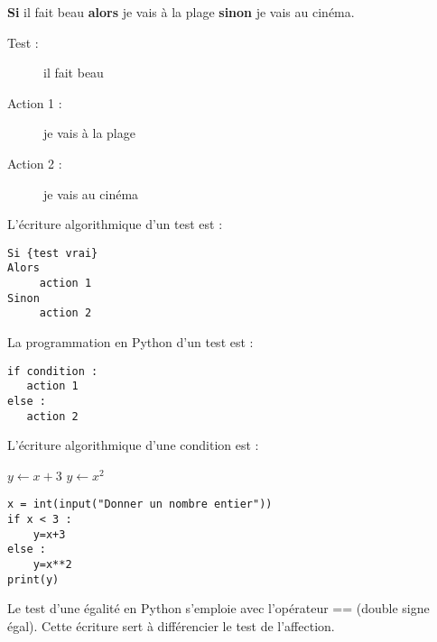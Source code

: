 \begin{Ex}
\textbf{Si} il fait beau \textbf{alors} je vais à la plage \textbf{sinon} je vais au cinéma.
\begin{description}
\item[Test :] il fait beau
\item[Action 1 :] je vais à la plage
\item[Action 2 :] je vais au cinéma
\end{description}
\end{Ex}


\begin{Syn}
\begin{minipage}[t]{0.49\linewidth}
L'écriture algorithmique d'un test est :
\begin{verbatim}
Si {test vrai}
Alors
	 action 1
Sinon
	 action 2    	
\end{verbatim}
\end{minipage}
\hfill\vrule\hfill
\begin{minipage}[t]{0.49\linewidth}
La programmation en Python d'un test est :
\begin{lstlisting}
if condition :
   action 1 
else :
   action 2
\end{lstlisting}
\end{minipage}
\end{Syn}


\begin{minipage}[t]{0.49\linewidth}
\begin{Ex}
L'écriture algorithmique d'une condition est :
\begin{algobox}
\DebutSi
\Ligne $y \longleftarrow x+3$ 
\FinSi
\Sinon
\DebutSinon
\Ligne $y \longleftarrow x^2$ 
\FinSinon
\end{algobox}
\end{Ex}
\end{minipage}
\hfill
\begin{minipage}[t]{0.49\linewidth}
\begin{Cod}
\begin{lstlisting}
x = int(input("Donner un nombre entier"))
if x < 3 :
	y=x+3 
else :
	y=x**2 
print(y)
\end{lstlisting}
\end{Cod}
\end{minipage}


\begin{Nt}
Le test d'une égalité en Python s'emploie avec l'opérateur == (double signe égal). Cette écriture sert à différencier le test de l'affection.
\end{Nt}


